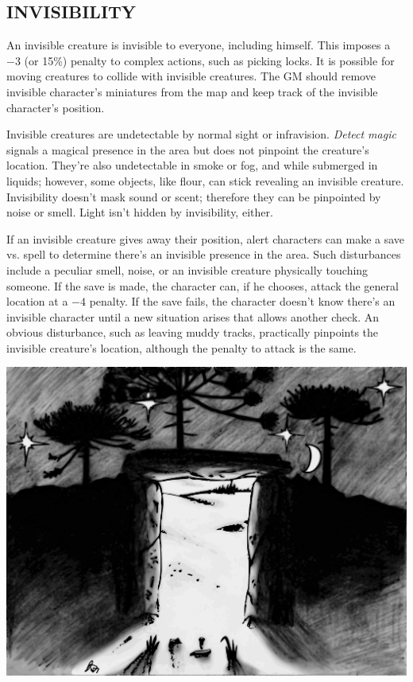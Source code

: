 \begin{multicols}{2}
\section{INVISIBILITY}

An invisible creature is invisible to everyone, including himself.  This imposes a $-3$ (or 15\%) penalty to complex actions, such as picking locks.  It is possible for moving creatures to collide with invisible creatures. The GM should remove invisible character's miniatures from the map and keep track of the invisible character's position.

Invisible creatures are undetectable by normal sight or infravision.  \textit{Detect magic} signals a magical presence in the area but does not pinpoint the creature's location.  They're also undetectable in smoke or fog, and while submerged in liquids; however, some objects, like flour, can stick revealing an invisible creature.  Invisibility doesn't mask sound or scent; therefore they can be pinpointed by noise or smell.  Light isn't hidden by invisibility, either.

If an invisible creature gives away their position, alert characters can make a save vs. spell to determine there's an invisible presence in the area.  Such disturbances include a peculiar smell, noise, or an invisible creature physically touching someone.  If the save is made, the character can, if he chooses, attack the general location at a $-4$ penalty.  If the save fails, the character doesn't know there's an invisible character until a new situation arises that allows another check.  An obvious disturbance, such as leaving muddy tracks, practically pinpoints the invisible creature's location, although the penalty to attack is the same.

\end{multicols}

\noindent\includegraphics[width=\textwidth]{araucariaportal.pdf}\label{araucariaportal}

